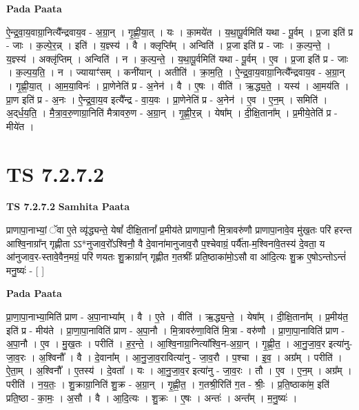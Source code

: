 \documentclass[17pt]{extarticle}
\begin{document}
\textbf{Pada Paata} \newline

ऐ॒न्द्र॒वा॒य॒वाग्रा॒नित्यै᳚न्द्रवाय॒व - अ॒ग्रा॒न् । गृ॒ह्णी॒या॒त् । यः । का॒मये॑त । य॒था॒पू॒र्वमिति॑ यथा - पू॒र्वम् । प्र॒जा इति॑ प्र - जाः । क॒ल्पे॒र॒न्न् । इति॑ । य॒ज्ञ्स्य॑ । वै । क्लृप्ति᳚म् । अन्विति॑ । प्र॒जा इति॑ प्र - जाः । क॒ल्प॒न्ते॒ । य॒ज्ञ्स्य॑ । अक्लृ॑प्तिम् । अन्विति॑ । न । क॒ल्प॒न्ते॒ । य॒था॒पू॒र्वमिति॑ यथा - पू॒र्वम् । ए॒व । प्र॒जा इति॑ प्र - जाः । क॒ल्प॒य॒ति॒ । न । ज्यायाꣳ॑सम् । कनी॑यान् । अतीति॑ । क्रा॒म॒ति॒ । ऐ॒न्द्र॒वा॒य॒वाग्रा॒नित्यै᳚न्द्रवाय॒व - अ॒ग्रा॒न् । गृ॒ह्णी॒या॒त् । आ॒म॒या॒विनः॑ । प्रा॒णेनेति॑ प्र - अ॒नेन॑ । वै । ए॒षः । वीति॑ । ऋ॒द्ध्य॒ते॒ । यस्य॑ । आ॒मय॑ति । प्रा॒ण इति॑ प्र - अ॒नः । ऐ॒न्द्र॒वा॒य॒व इत्यै᳚न्द्र - वा॒य॒वः । प्रा॒णेनेति॑ प्र - अ॒नेन॑ । ए॒व । ए॒न॒म् । समिति॑ । अ॒द्‌र्ध॒य॒ति॒ । मै॒त्रा॒व॒रु॒णाग्रा॒निति॑ मैत्रावरु॒ण - अ॒ग्रा॒न् । गृ॒ह्णी॒र॒न्न् । येषा᳚म् । दी॒क्षि॒ताना᳚म् । प्र॒मीये॒तेति॑ प्र - मीये॑त ।  \newline





\section{ TS 7.2.7.2 }

\textbf{TS 7.2.7.2 } \newline
\textbf{Samhita Paata} \newline

प्राणापा॒नाभ्यां॒ ॅवा ए॒ते व्यृ॑द्ध्यन्ते॒ येषां᳚ दीक्षि॒तानां᳚ प्र॒मीय॑ते प्राणापा॒नौ मि॒त्रावरु॑णौ प्राणापा॒नावे॒व मु॑ख॒तः परि॑ हरन्त आश्वि॒नाग्रा᳚न् गृह्णीता ऽऽ*नुजाव॒रो᳚ऽश्विनौ॒ वै दे॒वाना॑मानुजाव॒रौ प॒श्चेवाग्रं॒ पर्यै॑ता-म॒श्विना॑वे॒तस्य॑ दे॒वता॒ य आ॑नुजाव॒र-स्तावे॒वैन॒मग्रं॒ परि॑ णयतः शु॒क्राग्रा᳚न् गृह्णीत ग॒तश्रीः᳚ प्रति॒ष्ठाका॑मो॒ऽसौ वा आ॑दि॒त्यः शु॒क्र ए॒षोऽन्तोऽन्तं॑ मनु॒ष्यः॑ - [  ] \newline

\textbf{Pada Paata} \newline

प्रा॒णा॒पा॒नाभ्या॒मिति॑ प्राण - अ॒पा॒नाभ्या᳚म् । वै । ए॒ते । वीति॑ । ऋ॒द्ध्य॒न्ते॒ । येषा᳚म् । दी॒क्षि॒ताना᳚म् । प्र॒मीय॑त॒ इति॑ प्र - मीय॑ते । प्रा॒णा॒पा॒नाविति॑ प्राण - अ॒पा॒नौ । मि॒त्रावरु॑णा॒विति॑ मि॒त्रा - वरु॑णौ । प्रा॒णा॒पा॒नाविति॑ प्राण - अ॒पा॒नौ । ए॒व । मु॒ख॒तः । परीति॑ । ह॒र॒न्ते॒ । आ॒श्वि॒नाग्रा॒नित्या᳚श्वि॒न-अ॒ग्रा॒न् । गृ॒ह्णी॒त॒ । आ॒नु॒जा॒व॒र इत्या॑नु-जा॒व॒रः । अ॒श्विनौ᳚ । वै । दे॒वाना᳚म् । आ॒नु॒जा॒व॒रावित्या॑नु - जा॒व॒रौ । प॒श्चा । इ॒व॒ । अग्र᳚म् । परीति॑ । ऐ॒ता॒म् । अ॒श्विनौ᳚ । ए॒तस्य॑ । दे॒वता᳚ । यः । आ॒नु॒जा॒व॒र इत्या॑नु - जा॒व॒रः । तौ । ए॒व । ए॒न॒म् । अग्र᳚म् । परीति॑ । न॒य॒तः॒ । शु॒क्राग्रा॒निति॑ शु॒क्र - अ॒ग्रा॒न् । गृ॒ह्णी॒त॒ । ग॒तश्री॒रिति॑ ग॒त - श्रीः॒ । प्र॒ति॒ष्ठाका॑म॒ इति॑ प्रति॒ष्ठा - का॒मः॒ । अ॒सौ । वै । आ॒दि॒त्यः । शु॒क्रः । ए॒षः । अन्तः॑ । अन्त᳚म् । म॒नु॒ष्यः॑ ।  \newline
\end{document}
